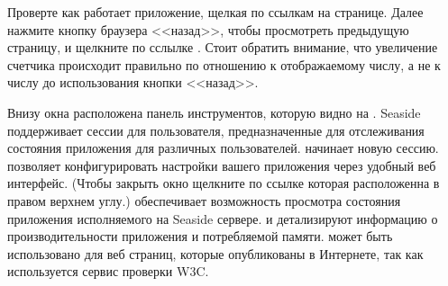 \documentclass[a4paper,10pt,twoside]{book}
\begin{document}

\noindent
Проверте как работает приложение, щелкая по ссылкам на странице.
Далее нажмите кнопку браузера <<назад>>,
чтобы просмотреть предыдущую страницу,
и щелкните по сслылке \link{++}.
Стоит обратить внимание, что увеличение счетчика происходит правильно по отношению к отображаемому числу, а не к числу до использования кнопки <<назад>>.



Внизу окна расположена панель инструментов,
которую видно на .
Seaside поддерживает сессии для пользователя,
предназначенные для отслеживания состояния приложения для различных пользователей.
 начинает новую сессию.
 позволяет конфигурировать настройки вашего приложения через удобный веб интерфейс.
(Чтобы закрыть окно  щелкните по ссылке 
которая расположенна в правом верхнем углу.)
 обеспечивает возможность просмотра состояния приложения
исполняемого на Seaside сервере.
 и  детализируют информацию о производительности приложения и потребляемой памяти.
 может быть использовано для веб страниц, которые опубликованы в Интернете, так как используется сервис проверки W3C.
\end{document}
